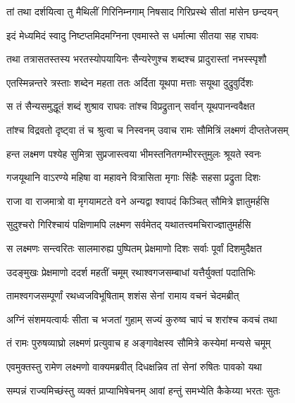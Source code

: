 
\twolineshloka
{तां तथा दर्शयित्वा तु मैथिलीं गिरिनिम्नगाम्}
{निषसाद गिरिप्रस्थे सीतां मांसेन छन्दयन्} %

\twolineshloka
{इदं मेध्यमिदं स्वादु निष्टप्तमिदमग्निना}
{एवमास्ते स धर्मात्मा सीतया सह राघवः} %

\twolineshloka
{तथा तत्रासतस्तस्य भरतस्योपयायिनः}
{सैन्यरेणुश्च शब्दश्च प्रादुरास्तां नभस्स्पृशौ} %

\twolineshloka
{एतस्मिन्नन्तरे त्रस्ताः शब्देन महता ततः}
{अर्दिता यूथपा मत्ताः सयूथा दुद्रुवुर्दिशः} %

\twolineshloka
{स तं सैन्यसमुद्धूतं शब्दं शुश्राव राघवः}
{तांश्च विप्रद्रुतान् सर्वान् यूथपानन्ववैक्षत} %

\twolineshloka
{तांश्च विद्रवतो दृष्ट्वा तं च श्रुत्वा च निस्वनम्}
{उवाच रामः सौमित्रिं लक्ष्मणं दीप्ततेजसम्} %

\twolineshloka
{हन्त लक्ष्मण पश्येह सुमित्रा सुप्रजास्त्वया}
{भीमस्तनितगम्भीरस्तुमुलः श्रूयते स्वनः} %

\twolineshloka
{गजयूथानि वाऽरण्ये महिषा वा महावने}
{वित्रासिता मृगाः सिंहैः सहसा प्रद्रुता दिशः} %

\twolineshloka
{राजा वा राजमात्रो वा मृगयामटते वने}
{अन्यद्वा श्वापदं किञ्चित् सौमित्रे ज्ञातुमर्हसि} %

\twolineshloka
{सुदुश्चरो गिरिश्चायं पक्षिणामपि लक्ष्मण}
{सर्वमेतद् यथातत्त्वमचिराज्ज्ञातुमर्हसि} %

\twolineshloka
{स लक्ष्मणः सन्त्वरितः सालमारुह्य पुष्पितम्}
{प्रेक्षमाणो दिशः सर्वाः पूर्वां दिशमुदैक्षत} %

\twolineshloka
{उदङ्मुखः प्रेक्षमाणो ददर्श महतीं चमूम्}
{रथाश्वगजसम्बाधां यत्तैर्युक्तां पदातिभिः} %

\twolineshloka
{तामश्वगजसम्पूर्णां रथध्वजविभूषिताम्}
{शशंस सेनां रामाय वचनं चेदमब्रीत्} %

\twolineshloka
{अग्निं संशमयत्वार्यः सीता च भजतां गुहाम्}
{सज्यं कुरुष्व चापं च शरांश्च कवचं तथा} %

\twolineshloka
{तं रामः पुरुषव्याघ्रो लक्ष्मणं प्रत्युवाच ह}
{अङ्गावेक्षस्व सौमित्रे कस्येमां मन्यसे चमूम्} %

\twolineshloka
{एवमुक्तस्तु रामेण लक्ष्मणो वाक्यमब्रवीत्}
{दिधक्षन्निव तां सेनां रुषितः पावको यथा} %

\twolineshloka
{सम्पन्नं राज्यमिच्छंस्तु व्यक्तं प्राप्याभिषेचनम्}
{आवां हन्तुं समभ्येति कैकेय्या भरतः सुतः} %

